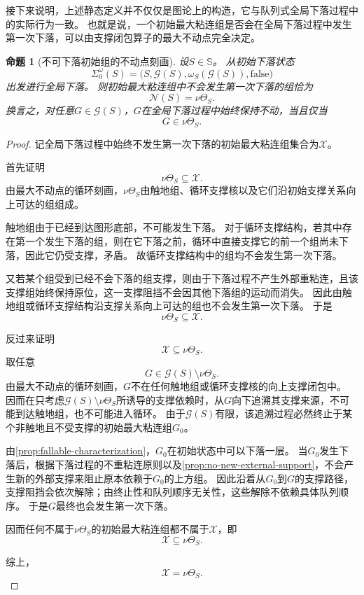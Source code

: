 \documentclass[UTF8,fontset=none]{ctexart}
\theoremstyle{cnthm}
\newtheorem{proposition}{命题}[section]
\begin{document}
			接下来说明，上述静态定义并不仅仅是图论上的构造，它与队列式全局下落过程中的实际行为一致。
			也就是说，一个初始最大粘连组是否会在全局下落过程中发生第一次下落，可以由支撑闭包算子的最大不动点完全决定。
			
			\begin{proposition}[不可下落初始组的不动点刻画]\label{prop:nonfalling-fixed-point}
				设$S\in\mathbb{S}$。
				从初始下落状态
				$$
				\Sigma_0^\omega(S)
				=
				\bigl(S,\mathcal{G}(S),\omega_S(\mathcal{G}(S)),\mathrm{false}\bigr)
				$$
				出发进行全局下落。
				则初始最大粘连组中不会发生第一次下落的组恰为
				$$
				\mathcal{N}(S)=\nu\Theta_S.
				$$
				换言之，对任意$G\in\mathcal{G}(S)$，$G$在全局下落过程中始终保持不动，当且仅当
				$$
				G\in\nu\Theta_S.
				$$
			\end{proposition}
			
			\begin{proof}
				记全局下落过程中始终不发生第一次下落的初始最大粘连组集合为$\mathcal{X}$。
				
				首先证明
				$$
				\nu\Theta_S\subseteq\mathcal{X}.
				$$
				由最大不动点的循环刻画，$\nu\Theta_S$由触地组、循环支撑核以及它们沿初始支撑关系向上可达的组组成。
				
				触地组由于已经到达图形底部，不可能发生下落。
				对于循环支撑结构，若其中存在第一个发生下落的组，则在它下落之前，循环中直接支撑它的前一个组尚未下落，因此它仍受支撑，矛盾。
				故循环支撑结构中的组均不会发生第一次下落。
				
				又若某个组受到已经不会下落的组支撑，则由于下落过程不产生外部重粘连，且该支撑组始终保持原位，这一支撑阻挡不会因其他下落组的运动而消失。
				因此由触地组或循环支撑结构沿支撑关系向上可达的组也不会发生第一次下落。
				于是
				$$
				\nu\Theta_S\subseteq\mathcal{X}.
				$$
				
				反过来证明
				$$
				\mathcal{X}\subseteq\nu\Theta_S.
				$$
				取任意
				$$
				G\in\mathcal{G}(S)\setminus\nu\Theta_S.
				$$
				由最大不动点的循环刻画，$G$不在任何触地组或循环支撑核的向上支撑闭包中。
				因而在只考虑$\mathcal{G}(S)\setminus\nu\Theta_S$所诱导的支撑依赖时，从$G$向下追溯其支撑来源，不可能到达触地组，也不可能进入循环。
				由于$\mathcal{G}(S)$有限，该追溯过程必然终止于某个非触地且不受支撑的初始最大粘连组$G_0$。
				
				由\cref{prop:fallable-characterization}，$G_0$在初始状态中可以下落一层。
				当$G_0$发生下落后，根据下落过程的不重粘连原则以及\cref{prop:no-new-external-support}，不会产生新的外部支撑来阻止原本依赖于$G_0$的上方组。
				因此沿着从$G_0$到$G$的支撑路径，支撑阻挡会依次解除；由终止性和队列顺序无关性，这些解除不依赖具体队列顺序。
				于是$G$最终也会发生第一次下落。
				
				因而任何不属于$\nu\Theta_S$的初始最大粘连组都不属于$\mathcal{X}$，即
				$$
				\mathcal{X}\subseteq\nu\Theta_S.
				$$
				
				综上，
				$$
				\mathcal{X}=\nu\Theta_S.
				$$
			\end{proof}
			
\end{document}
